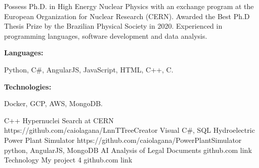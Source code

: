 \documentclass[9pt]{developercv} %
\begin{document}
\begin{minipage}[t]{0.46\textwidth}
	\vspace{-6pt}
 
  Possess Ph.D. in High Energy Nuclear Physics with an exchange program at the European Organization for Nuclear Research (CERN). Awarded the Best Ph.D Thesis Prize by the Brazilian Physical Society in 2020. Experienced in programming languages, software development and data analysis. \\
\end{minipage}
\hfill %
\begin{minipage}[t]{0.465\textwidth}
    \vspace{-6pt}
    
    \begin{minipage}[t]{0.2\textwidth}
        \textbf{Languages:}
    \end{minipage}
    \hfill
    \begin{minipage}[t]{0.73\textwidth}
      Python, C\#, AngularJS, JavaScript, HTML, C++, C.  
    \end{minipage}
    \vspace{4mm}
    
    \begin{minipage}[t]{0.2\textwidth}
        \textbf{Technologies:}
    \end{minipage}
    \hfill
    \begin{minipage}[t]{0.73\textwidth}
      Docker, GCP, AWS, MongoDB.
    \end{minipage}
    
\end{minipage}

\begin{entrylist}
	\entry
		{C++}
		{Hypernuclei Search at CERN}
		{https://github.com/caiolagana/LnnTTreeCreator}
		{%
        \lipsum[1][1-3]}
    \entry
		{Visual C\#, SQL}
		{Hydroelectric Power Plant Simulator}
		{https://github.com/caiolagana/PowerPlantSimulator}
		{%
        \lipsum[1][1-3]}
    \entry
		{python, AngularJS, MongoDB}
		{AI Analysis of Legal Documents}
		{github.com link}
		{%
        \lipsum[1][1-3]}
    \entry
		{Technology}
		{My project 4}
		{github.com link}
		{%
        \lipsum[1][1-3]}
\end{entrylist}
\end{document}
